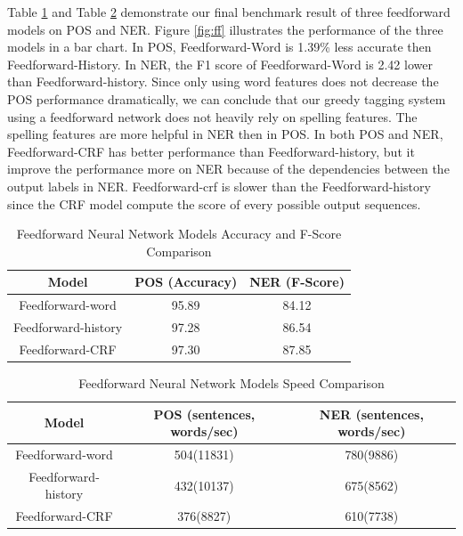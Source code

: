 \documentclass{sfuthesis}
\begin{document}
Table \ref{table:ff-table1} and Table \ref{table:ff-tabel2} demonstrate our final benchmark result of three feedforward models on POS and NER. Figure \ref{fig:ff} illustrates the performance of the three models in a bar chart. In POS, Feedforward-Word is 1.39\% less accurate then Feedforward-History. In NER, the F1 score of Feedforward-Word is 2.42 lower than Feedforward-history. Since only using word features does not decrease the POS performance dramatically, we can conclude that our greedy tagging system using a feedforward network does not heavily rely on spelling features. The spelling features are more helpful in NER then in POS. In both POS and NER, Feedforward-CRF has better performance than Feedforward-history, but it improve the performance more on NER because of the dependencies between the output labels in NER. Feedforward-crf is slower than the Feedforward-history since the CRF model compute the score of every possible output sequences.

\begin{table}[]
\centering
\caption{Feedforward Neural Network Models Accuracy and F-Score Comparison}
\label{table:ff-table1}
\begin{tabular}{|c|c|c|}
\hline
Model         & POS (Accuracy)  & NER (F-Score)       \\ \hline
Feedforward-word    & 95.89          &   84.12     \\ \hline
Feedforward-history & 97.28     & 86.54        \\ \hline
Feedforward-CRF     & 97.30          &   87.85     \\ \hline
\end{tabular}
\end{table}

\begin{table}[]
\centering
\caption{Feedforward Neural Network Models Speed Comparison}
\label{table:ff-tabel2}
\begin{tabular}{|c|c|c|}
\hline
Model       & POS  (sentences, words/sec)  & NER  (sentences, words/sec)      \\ \hline
Feedforward-word    & 504(11831)     & 780(9886)    \\ \hline
Feedforward-history & 432(10137)     & 675(8562)     \\ \hline
Feedforward-CRF    & 376(8827)     & 610(7738)     \\ \hline
\end{tabular}
\end{table}
\end{document}
